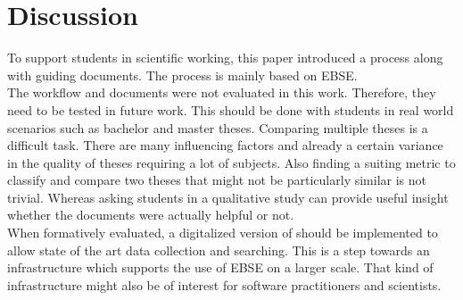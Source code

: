 
\section{Discussion}
\label{sec:discussion}

To support students in scientific working, this paper introduced a process along with guiding documents.
The process is mainly based on EBSE.\\
The workflow and documents were not evaluated in this work. Therefore, they need to be tested in future work. This should be done with students in real world scenarios such as bachelor and master theses. Comparing multiple theses is a difficult task. There are many influencing factors and already a certain variance in the quality of theses requiring a lot of subjects. Also finding a suiting metric to classify and compare two theses that might not be particularly similar is not trivial. Whereas asking students in a qualitative study can provide useful insight whether the documents were actually helpful or not.\\
When formatively evaluated, a digitalized version of \briefingform should be implemented to allow state of the art data collection and searching. This is a step towards an infrastructure which supports the use of EBSE on a larger scale. That kind of infrastructure might also be of interest for software practitioners and scientists.